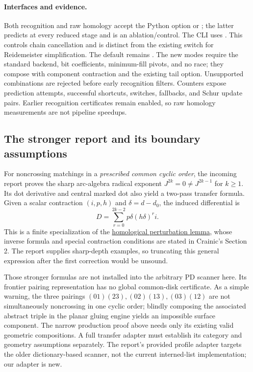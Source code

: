 \paragraph{Interfaces and evidence.}
Both recognition and raw homology accept the Python option
 or ; the latter
predicts at every reduced stage and is an ablation/control. The CLI
uses . This controls
chain cancellation and is distinct from the existing
 switch for Reidemeister simplification.
The default remains . The new modes require the
standard backend, bit coefficients, minimum-fill pivots, and no race;
they compose with component contraction and the existing tail option.
Unsupported combinations are rejected before early recognition filters.
Counters expose prediction attempts, successful shortcuts, switches,
fallbacks, and Schur update pairs. Earlier recognition certificates
remain enabled, so raw homology measurements are not pipeline speedups.

\subsection{The stronger report and its boundary assumptions}
For noncrossing matchings in a \emph{prescribed common cyclic order},
the incoming report proves the sharp arc-algebra radical exponent
$J^{2k}=0\ne J^{2k-1}$ for $k\ge1$. Its dot derivative and central
marked dot also yield a two-pass transfer formula. Given a scalar
contraction $(i,p,h)$ and $\delta=d-d_0$, the induced differential is
\[
  D=\sum_{r=0}^{2k-2}p\delta(h\delta)^ri.
\]
This is a finite specialization of the
\href{https://arxiv.org/abs/math/0403266}{homological perturbation lemma},
whose inverse formula and special contraction conditions are stated
in Crainic's Section 2. The report supplies sharp-depth examples,
so truncating this general expression after the first correction
would be unsound.

Those stronger formulas are not installed into the arbitrary PD
scanner here. Its frontier pairing representation has no global
common-disk certificate. As a simple warning, the three pairings
$(01)(23),(02)(13),(03)(12)$ are not simultaneously noncrossing in
one cyclic order; blindly composing the associated abstract triple
in the planar gluing engine yields an impossible surface component.
The narrow production proof above needs only its existing valid
geometric compositions. A full transfer adapter must establish
its category and geometry assumptions separately. The report's
provided profile adapter targets the older dictionary-based scanner,
not the current interned-list implementation; our adapter is new.

